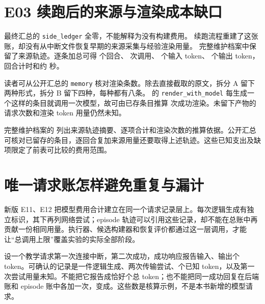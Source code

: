
\section{E03 续跑后的来源与渲染成本缺口}
\label{sec:appf-e03-recovered}

最终汇总的 \texttt{side\_ledger} 全零，不能解释为没有构建费用。
续跑流程重建了这张账，却没有从中断文件恢复早期的来源采集与经验渲染用量。
完整维护档案中保留了来源轨迹。逐条加总可得  个回合、 次调用、
 个输入 token、 个输出 token，回合计时和约  秒。

读者可从公开汇总的 \texttt{memory} 核对渲染条数。除去直接截取的原文，拆分 A 留下两种形式，拆分 B 留下四种，每种都有八条。 的 \texttt{render\_with\_model} 每生成一个这样的条目就调用一次模型，故可由已存条目推算  次成功渲染。未留下产物的请求次数和渲染 token 用量仍然未知。

\begin{sloppypar}
完整维护档案的  列出来源轨迹摘要、逐项合计和渲染次数的推算依据。公开汇总可核对已留存的条目，逐回合复加来源用量还要取得上述轨迹。这些已知支出及缺项限定了前表可比较的费用范围。
\end{sloppypar}

\section{唯一请求账怎样避免重复与漏计}
\label{sec:appf-requestjournal}

新版 E11、E12 把模型费用合计建立在同一个请求记录层上。每次逻辑生成有独立标识，其下再列网络尝试；episode 轨迹可以引用这些记录，却不能在总账中再贡献一份相同用量。执行器、候选构建器和恢复评价都通过这一层调用，才能让“总调用上限”覆盖实验的实际全部阶段。

设一个教学请求第一次连接中断，第二次成功，成功响应报告输入、输出个 token。可确认的记录是一件逻辑生成、两次传输尝试、个已知 token，以及第一次尝试用量未知。不能把它报告成恰好个总 token；也不能把同一成功回复在后端账和 episode 账中各加一次，变成。这些数是核算示例，不是本书新增的模型请求。

